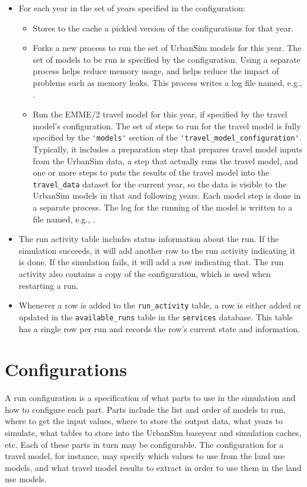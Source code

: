 \begin{itemize}
\item For each year in the set of years specified in the configuration:
  \begin{itemize}
  \item Stores to the cache a pickled version of the configurations for that
  year.
  \item Forks a new process to run the set of UrbanSim models for this year.
  The set of models to be run is specified by the configuration. Using a
  separate process helps reduce memory usage,  and helps reduce the impact of problems such as memory leaks.  This
  process writes a log file named, e.g., .
  \item Run the EMME/2  travel model for this year, if specified by the travel
  model's configuration.  The set of steps to run for the travel model is fully
  specified by the \verb|'models'| section of the
  \verb|'travel_model_configuration'|. Typically, it includes a preparation step
  that prepares travel model inputs from the UrbanSim data, a step that
  actually runs the travel model, and one or more steps to puts the results of
  the travel model into the \verb|travel_data| dataset for the current year, so
  the data is visible to the UrbanSim models in that and following years.  Each
  model step is done in a separate process.  The log for the running of the
  model is written to a file named, e.g., .
  \end{itemize}
  \item The run activity table includes status information about the run.  If
  the simulation succeeds, it will add another row to the run activity
  indicating it is done.  If the simulation fails, it will add a row indicating
  that.  The run activity also contains a copy of the configuration, which is
  used when restarting a run.
  \item Whenever a row is added to the \verb|run_activity| table, a row is
  either added or updated in the \verb|available_runs| table in the
  \verb|services| database. This table has a single row per run and records the
  row's current state and information.
\end{itemize}

\section{Configurations}
\label{sec:configuration}
%
A run configuration is a specification of what parts to use in the simulation
and how to configure each part.  Parts include the list and order of models to
run, where to get the input values, where to store the output data, what years
to simulate, what tables to store into the UrbanSim baseyear and simulation
caches\simulationcacheindex, etc. Each of these parts in
turn may be configurable.  The configuration for a travel model, for instance,
may specify which values to use from the land use models, and what travel model
results to extract in order to use them in the land use models. 


